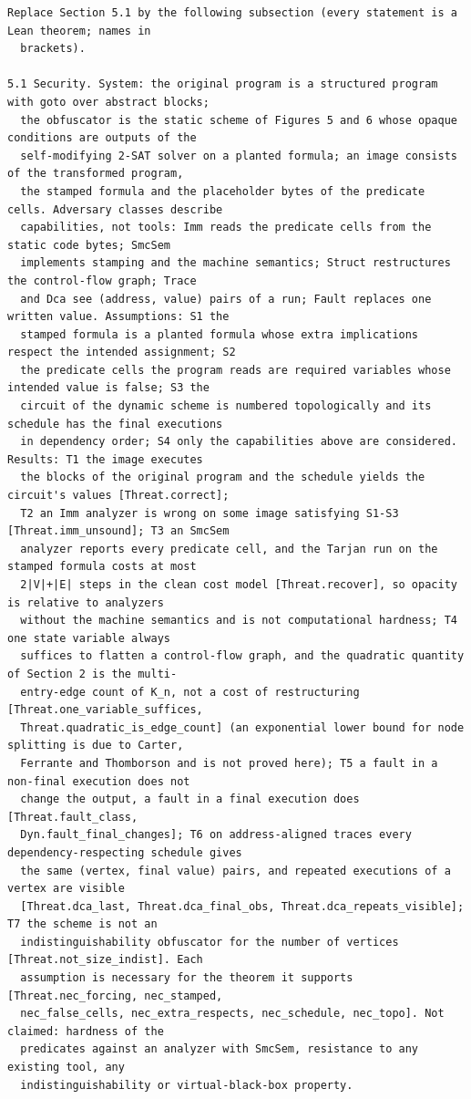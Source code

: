 \documentclass[9pt,twocolumn]{article}
\begin{document}
\begin{small}\begin{verbatim}
Replace Section 5.1 by the following subsection (every statement is a Lean theorem; names in
  brackets).

5.1 Security. System: the original program is a structured program with goto over abstract blocks;
  the obfuscator is the static scheme of Figures 5 and 6 whose opaque conditions are outputs of the
  self-modifying 2-SAT solver on a planted formula; an image consists of the transformed program,
  the stamped formula and the placeholder bytes of the predicate cells. Adversary classes describe
  capabilities, not tools: Imm reads the predicate cells from the static code bytes; SmcSem
  implements stamping and the machine semantics; Struct restructures the control-flow graph; Trace
  and Dca see (address, value) pairs of a run; Fault replaces one written value. Assumptions: S1 the
  stamped formula is a planted formula whose extra implications respect the intended assignment; S2
  the predicate cells the program reads are required variables whose intended value is false; S3 the
  circuit of the dynamic scheme is numbered topologically and its schedule has the final executions
  in dependency order; S4 only the capabilities above are considered. Results: T1 the image executes
  the blocks of the original program and the schedule yields the circuit's values [Threat.correct];
  T2 an Imm analyzer is wrong on some image satisfying S1-S3 [Threat.imm_unsound]; T3 an SmcSem
  analyzer reports every predicate cell, and the Tarjan run on the stamped formula costs at most
  2|V|+|E| steps in the clean cost model [Threat.recover], so opacity is relative to analyzers
  without the machine semantics and is not computational hardness; T4 one state variable always
  suffices to flatten a control-flow graph, and the quadratic quantity of Section 2 is the multi-
  entry-edge count of K_n, not a cost of restructuring [Threat.one_variable_suffices,
  Threat.quadratic_is_edge_count] (an exponential lower bound for node splitting is due to Carter,
  Ferrante and Thomborson and is not proved here); T5 a fault in a non-final execution does not
  change the output, a fault in a final execution does [Threat.fault_class,
  Dyn.fault_final_changes]; T6 on address-aligned traces every dependency-respecting schedule gives
  the same (vertex, final value) pairs, and repeated executions of a vertex are visible
  [Threat.dca_last, Threat.dca_final_obs, Threat.dca_repeats_visible]; T7 the scheme is not an
  indistinguishability obfuscator for the number of vertices [Threat.not_size_indist]. Each
  assumption is necessary for the theorem it supports [Threat.nec_forcing, nec_stamped,
  nec_false_cells, nec_extra_respects, nec_schedule, nec_topo]. Not claimed: hardness of the
  predicates against an analyzer with SmcSem, resistance to any existing tool, any
  indistinguishability or virtual-black-box property.
\end{verbatim}\end{small}
\end{document}
